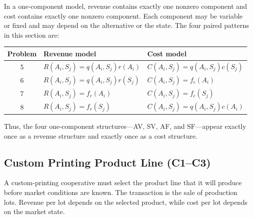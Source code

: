 \vspace{0.8cm}

In a one-component model, revenue contains exactly one nonzero component
and cost contains exactly one nonzero component. Each component may be
variable or fixed and may depend on the alternative or the state. The four paired patterns in this section are:

\begin{center}
	\small
	\begin{tabular}{cll}
		\toprule
		Problem & Revenue model & Cost model \\
		\midrule
		5
		& \(R(A_i,S_j)=q(A_i,S_j)r(A_i)\)
		& \(C(A_i,S_j)=q(A_i,S_j)c(S_j)\) \\
		
		6
		& \(R(A_i,S_j)=q(A_i,S_j)r(S_j)\)
		& \(C(A_i,S_j)=f_c(A_i)\) \\
		
		7
		& \(R(A_i,S_j)=f_r(A_i)\)
		& \(C(A_i,S_j)=f_c(S_j)\) \\
		
		8
		& \(R(A_i,S_j)=f_r(S_j)\)
		& \(C(A_i,S_j)=q(A_i,S_j)c(A_i)\) \\
		\bottomrule
	\end{tabular}
\end{center}

Thus, the four one-component structures---AV, SV, AF, and SF---appear
exactly once as a revenue structure and exactly once as a cost structure.

\subsection{Custom Printing Product Line (C1--C3)}
\label{sec:problem5-custom-printing-product-line-c1-c3}

A custom-printing cooperative must select the product line that it will
produce before market conditions are known. The transaction is the sale of
production lots. Revenue per lot depends on the selected product, while cost
per lot depends on the market state.

